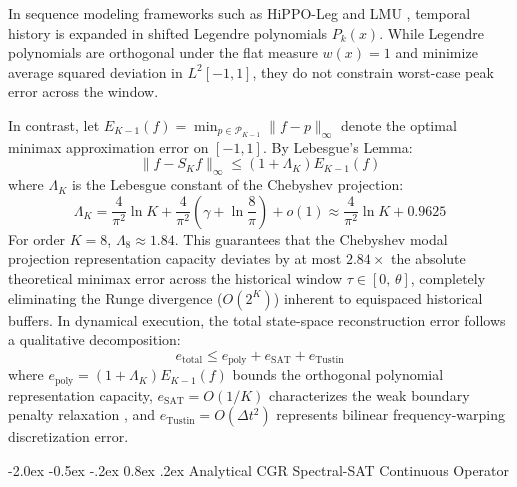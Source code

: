 \documentclass[10pt,twocolumn,a4paper]{article}
\makeatletter
\renewcommand\section{\@startsection{section}{1}{\z@}%
  {-2.0ex \@plus -0.5ex \@minus -.2ex}%
  {0.8ex \@plus .2ex}%
  {\normalfont\large\bfseries}}
\theoremstyle{plain}
\theoremstyle{definition}
\makeatother
\begin{document}
In sequence modeling frameworks such as HiPPO-Leg \cite{gu2020hippo} and LMU \cite{voelker2019legendre}, temporal history is expanded in shifted Legendre polynomials $P_k(x)$. While Legendre polynomials are orthogonal under the flat measure $w(x) = 1$ and minimize average squared deviation in $L^2[-1, 1]$, they do not constrain worst-case peak error across the window.

In contrast, let $E_{K-1}(f) = \min_{p \in \mathcal{P}_{K-1}} \|f - p\|_\infty$ denote the optimal minimax approximation error on $[-1, 1]$. By Lebesgue's Lemma:
\begin{equation}
\|f - S_K f\|_\infty \le (1 + \Lambda_K) E_{K-1}(f)
\end{equation}
where $\Lambda_K$ is the Lebesgue constant of the Chebyshev projection:
\begin{equation}
\Lambda_K = \frac{4}{\pi^2} \ln K + \frac{4}{\pi^2} \left( \gamma + \ln\frac{8}{\pi} \right) + o(1) \approx \frac{4}{\pi^2} \ln K + 0.9625
\label{eq:lebesgue}
\end{equation}
For order $K=8$, $\Lambda_8 \approx 1.84$. This guarantees that the Chebyshev modal projection representation capacity deviates by at most $2.84\times$ the absolute theoretical minimax error across the historical window $\tau \in [0, \, \theta]$, completely eliminating the Runge divergence ($O(2^K)$) inherent to equispaced historical buffers. In dynamical execution, the total state-space reconstruction error follows a qualitative decomposition:
\begin{equation}
e_{\mathrm{total}} \le e_{\mathrm{poly}} + e_{\mathrm{SAT}} + e_{\mathrm{Tustin}}
\end{equation}
where $e_{\mathrm{poly}} = (1 + \Lambda_K) E_{K-1}(f)$ bounds the orthogonal polynomial representation capacity, $e_{\mathrm{SAT}} = O(1/K)$ characterizes the weak boundary penalty relaxation \cite{carpenter1994time, hesthaven2007spectral}, and $e_{\mathrm{Tustin}} = O(\Delta t^2)$ represents bilinear frequency-warping discretization error.

\section{Analytical CGR Spectral-SAT Continuous Operator}
\end{document}
